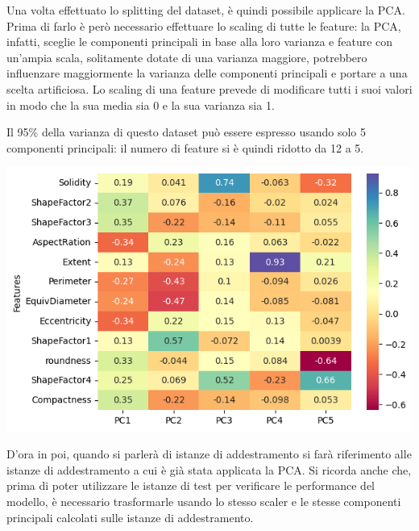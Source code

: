 Una volta effettuato lo splitting del dataset, è quindi possibile applicare la PCA.
Prima di farlo è però necessario effettuare lo scaling di tutte
le feature: la PCA, infatti, sceglie le componenti principali in base alla
loro varianza e feature con un'ampia scala, solitamente dotate di una 
varianza maggiore, potrebbero influenzare maggiormente la varianza delle
componenti principali e portare a una scelta artificiosa.
Lo scaling di una feature prevede di modificare tutti i suoi valori in modo 
che la sua media sia 0 e la sua varianza sia 1.

Il 95\% della varianza di questo dataset può essere espresso usando solo
5 componenti principali: il numero di feature si è quindi ridotto da 12 a 5.

\begin{Figure}
    \centering
    \includegraphics[width=\linewidth]{img/pca_features_weights.png}
\end{Figure}

D'ora in poi, quando si parlerà di istanze di addestramento si farà riferimento
alle istanze di addestramento a cui è già stata applicata la PCA.
Si ricorda anche che, prima di poter utilizzare le istanze di test per verificare
le performance del modello, è necessario trasformarle usando lo stesso
scaler e le stesse componenti principali calcolati sulle istanze di addestramento. 
